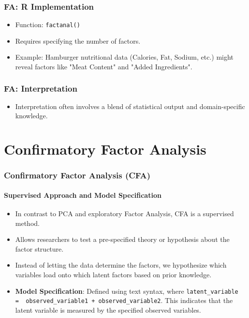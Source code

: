 \documentclass{beamer}
\newcommand{\code}[1]{\texttt{#1}}
\begin{document}
\begin{frame}
    \frametitle{FA: R Implementation}
    \begin{itemize}
        \item Function: \code{factanal()}
        \item Requires specifying the number of factors.
        \item Example: Hamburger nutritional data (Calories, Fat, Sodium, etc.) might reveal factors like "Meat Content" and "Added Ingredients".
    \end{itemize}
\end{frame}

\begin{frame}
    \frametitle{FA: Interpretation}
    \begin{itemize}
        \item Interpretation often involves a blend of statistical output and domain-specific knowledge.
    \end{itemize}
\end{frame}

\section{Confirmatory Factor Analysis}

\begin{frame}
    \frametitle{Confirmatory Factor Analysis (CFA)}
    \framesubtitle{Supervised Approach and Model Specification}
    \begin{itemize}
        \item In contrast to PCA and exploratory Factor Analysis, CFA is a \alert{supervised} method.
        \item Allows researchers to \alert{test a pre-specified theory} or hypothesis about the factor structure.
        \item Instead of letting the data determine the factors, we hypothesize which variables load onto which latent factors based on prior knowledge.
    \item \textbf{Model Specification}: Defined using text syntax, where \texttt{latent\_variable =~ observed\_variable1 + observed\_variable2}. This indicates that the latent variable is measured by the specified observed variables.
    \end{itemize}
\end{frame}
\end{document}

